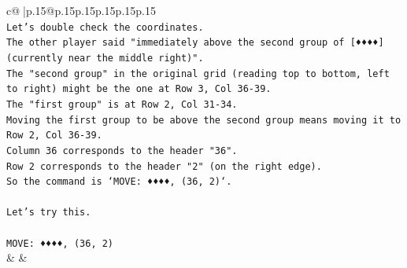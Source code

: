 \documentclass{article}
\begin{document}
{\begin{supertabular}{c@{$\;$}|p{.15\linewidth}@{}p{.15\linewidth}p{.15\linewidth}p{.15\linewidth}p{.15\linewidth}p{.15\linewidth}}
{{{\\ 
\texttt{Let's double check the coordinates.} \\
\texttt{The other player said "immediately above the second group of {[}♦♦♦♦{]} (currently near the middle right)".} \\
\texttt{The "second group" in the original grid (reading top to bottom, left to right) might be the one at Row 3, Col 36{-}39.} \\
\texttt{The "first group" is at Row 2, Col 31{-}34.} \\
\texttt{Moving the first group to be above the second group means moving it to Row 2, Col 36{-}39.} \\
\texttt{Column 36 corresponds to the header "36".} \\
\texttt{Row 2 corresponds to the header "2" (on the right edge).} \\
\texttt{So the command is `MOVE: ♦♦♦♦, (36, 2)`.} \\
\\ 
\texttt{Let's try this.} \\
\\ 
\texttt{MOVE: ♦♦♦♦, (36, 2)} \\
            }
        }
    }
    & & \\ \\


\end{supertabular}}
\end{document}
